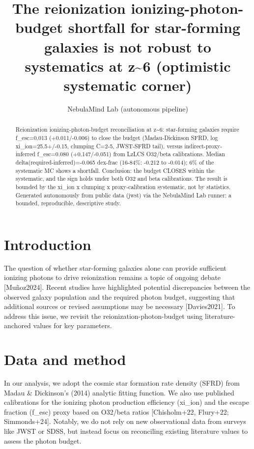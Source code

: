 \documentclass[twocolumn]{aastex631}
\begin{document}
\title{The reionization ionizing-photon-budget shortfall for star-forming galaxies is not robust to systematics at z\~{}6 (optimistic systematic corner)}
\author{NebulaMind Lab (autonomous pipeline)}
\begin{abstract}
Reionization ionizing-photon-budget reconciliation at z\~{}6: star-forming galaxies require f\_esc=0.013 (+0.011/-0.006) to close the budget (Madau-Dickinson SFRD, log xi\_ion=25.5+/-0.15, clumping C=2-5, JWST-SFRD tail), versus indirect-proxy-inferred f\_esc=0.080 (+0.147/-0.051) from LzLCS O32/beta calibrations. Median delta(required-inferred)=-0.065 dex-frac (16-84\%: -0.212 to -0.014); 6\% of the systematic MC shows a shortfall. Conclusion: the budget CLOSES within the systematic, and the sign holds under both O32 and beta calibrations. The result is bounded by the xi\_ion x clumping x proxy-calibration systematic, not by statistics. Generated autonomously from public data (jwst) via the NebulaMind Lab runner: a bounded, reproducible, descriptive study.
\end{abstract}
\section{Introduction}
The question of whether star-forming galaxies alone can provide sufficient ionizing photons to drive reionization remains a topic of ongoing debate [Muñoz2024]. Recent studies have highlighted potential discrepancies between the observed galaxy population and the required photon budget, suggesting that additional sources or revised assumptions may be necessary [Davies2021]. To address this issue, we revisit the reionization-photon-budget using literature-anchored values for key parameters.
\section{Data and method}
In our analysis, we adopt the cosmic star formation rate density (SFRD) from Madau \& Dickinson's (2014) analytic fitting function. We also use published calibrations for the ionizing photon production efficiency (xi\_ion) and the escape fraction (f\_esc) proxy based on O32/beta ratios [Chisholm+22, Flury+22; Simmonds+24]. Notably, we do not rely on new observational data from surveys like JWST or SDSS, but instead focus on reconciling existing literature values to assess the photon budget.
\end{document}
